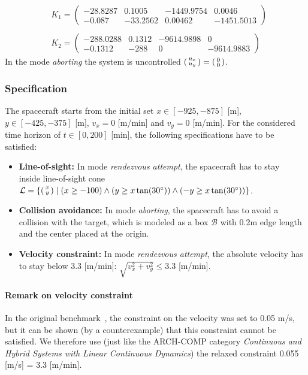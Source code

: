 \documentclass[EPiC]{easychair}
\begin{document}
\begin{align*}
	& K_1 = \begin{pmatrix} -28.8287 & 0.1005 & -1449.9754 &   0.0046 \\
  -0.087 & -33.2562 & 0.00462 & -1451.5013 \end{pmatrix} \\
    & ~ \\
    & K_2 = \begin{pmatrix} -288.0288 & 0.1312 & -9614.9898 & 0 \\
  -0.1312 & -288 & 0 & -9614.9883 \end{pmatrix}
\end{align*}
In the mode \textit{aborting} the system is uncontrolled $\begin{psmallmatrix}u_x \\ u_y\end{psmallmatrix} = \begin{psmallmatrix}0 \\ 0\end{psmallmatrix}$. 


\subsubsection{Specification}

The spacecraft starts from the initial set $x \in [-925,-875]$ [m], $y \in [-425,-375]$ [m], $v_x = 0$ [m/min] and $v_y = 0$ [m/min]. For the considered time horizon of $t \in [0,200]$ [min], the following specifications have to be satisfied:

\begin{itemize}
\item \textbf{Line-of-sight:} In mode \textit{rendezvous attempt}, the spacecraft has to stay \\
inside line-of-sight cone $\mathcal{L} = \{ \begin{psmallmatrix}x \\ y\end{psmallmatrix} \mid (x \geq -100) \land (y \geq x \tan(30^\circ)) \land (-y \geq x \tan(30^\circ))\}$.
%
\item \textbf{Collision avoidance:} In mode \textit{aborting}, the spacecraft has to avoid a collision with the target, which is modeled as a box $\mathcal{B}$ with 0.2m edge length and the center placed at the origin.
%
\item \textbf{Velocity constraint:} In mode \textit{rendezvous attempt}, the absolute velocity has to stay below $3.3$ [m/min]: $\sqrt{v_x^2 + v_y^2}\leq 3.3$ [m/min].
\end{itemize}

\paragraph{Remark on velocity constraint} In the original benchmark~\cite{Chan2017a}, the constraint on the velocity was set to 0.05 m/s, but it can be shown (by a counterexample) that this constraint cannot be satisfied. We therefore use (just like the ARCH-COMP category \textit{Continuous and Hybrid Systems with Linear Continuous Dynamics}) the relaxed constraint 0.055 [m/s] = 3.3 [m/min].
\end{document}
